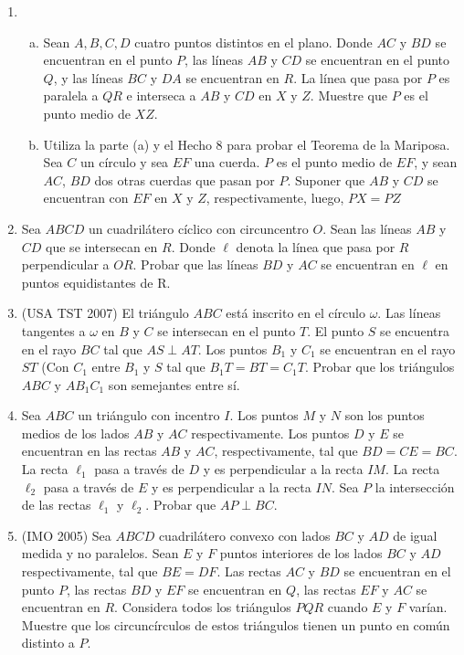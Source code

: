 \documentclass[11pt, a4paper]{article}
\begin{document}
\begin{enumerate}
	\item \begin{enumerate}[a.]
		\item Sean $A, B, C, D$ cuatro puntos distintos en el plano. Donde $AC$ y $BD$ se encuentran en el punto $P$, las l\'ineas $AB$ y $CD$ se encuentran en el punto $Q$, y las l\'ineas $BC$ y $DA$ se encuentran en $R$. La l\'inea que pasa por $P$ es paralela a $QR$ e interseca a $AB$ y $CD$ en $X$ y $Z$. Muestre que $P$ es el punto medio de $XZ$.
		\item Utiliza la parte (a) y el Hecho 8 para probar el Teorema de la Mariposa. Sea $C$ un c\'irculo y sea $EF$ una cuerda. $P$ es el punto medio de $EF$, y sean $AC$, $BD$ dos otras cuerdas que pasan por $P$. Suponer que $AB$ y $CD$ se encuentran con $EF$ en $X$ y $Z$, respectivamente, luego, $PX=PZ$
	\end{enumerate}
\item Sea $ABCD$ un cuadril\'atero c\'iclico con circuncentro $O$. Sean las l\'ineas $AB$ y $CD$ que se intersecan en $R$. Donde $\ell$ denota la l\'inea que pasa por $R$ perpendicular a $OR$. Probar que las l\'ineas $BD$ y $AC$ se encuentran en $\ell$ en puntos equidistantes de R.
\item (USA TST 2007) El tri\'angulo $ABC$ est\'a inscrito en el c\'irculo $\omega$. Las l\'ineas tangentes a $\omega$ en $B$ y $C$ se intersecan en el punto $T$. El punto $S$ se encuentra en el rayo $BC$ tal que $AS \perp AT$. Los puntos $B_1$ y $C_1$ se encuentran en el rayo $ST$ (Con $C_1$ entre $B_1$ y $S$ tal que $B_1T = BT = C_1T$. Probar que los tri\'angulos $ABC$ y $AB_1C_1$ son semejantes entre s\'i.
\item Sea $ABC$ un tri\'angulo con incentro $I$. Los puntos $M$ y $N$ son los puntos medios de los lados $AB$ y $AC$ respectivamente. Los puntos $D$ y $E$ se encuentran en las rectas $AB$ y $AC$, respectivamente, tal que $BD= CE = BC$. La recta $\ell_1$ pasa a trav\'es de $D$ y es perpendicular a la recta $IM$. La recta $\ell_2$ pasa a trav\'es de $E$ y es perpendicular a la recta $IN$. Sea $P$ la intersecci\'on de las rectas $\ell_1$ y $\ell_2$. Probar que $AP \perp BC$.
\item (IMO 2005) Sea $ABCD$ cuadril\'atero convexo con lados $BC$ y $AD$ de igual medida y no paralelos. Sean $E$ y $F$ puntos interiores de los lados $BC$ y $AD$ respectivamente, tal que $BE = DF$. Las rectas $AC$ y $BD$ se encuentran en el punto $P$, las rectas $BD$ y $EF$ se encuentran en $Q$, las rectas $EF$ y $AC$ se encuentran en $R$. Considera todos los tri\'angulos $PQR$ cuando $E$ y $F$ var\'ian. Muestre que los circunc\'irculos de estos tri\'angulos tienen un punto en com\'un distinto a $P$.

\end{enumerate}
\end{document}
